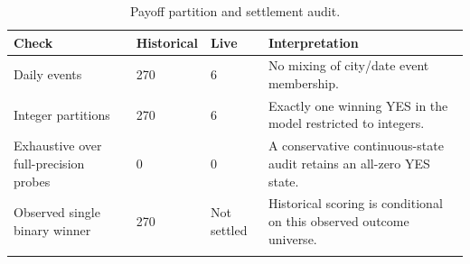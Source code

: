 \begin{table}[htbp]\centering
{\fontsize{10}{12}\selectfont\renewcommand{\arraystretch}{1.18}\setlength{\tabcolsep}{4pt}
\begin{tabularx}{\linewidth}{@{}L{55mm}C{20mm}C{20mm}X@{}}\toprule{}
\textbf{Check} & \textbf{Historical} & \textbf{Live} & \textbf{Interpretation} \\ \midrule
Daily events & 270 & 6 & No mixing of city/date event membership. \\ \hline
Integer partitions & 270 & 6 & Exactly one winning YES in the model restricted to integers. \\ \hline
Exhaustive over full-precision probes & 0 & 0 & A conservative continuous-state audit retains an all-zero YES state. \\ \hline
Observed single binary winner & 270 & Not settled & Historical scoring is conditional on this observed outcome universe. \\ \hline
{}\bottomrule\end{tabularx}}
\caption[Payoff partition and settlement audit]{Payoff partition and settlement audit.}\label{tab:contract-audit}
\end{table}
